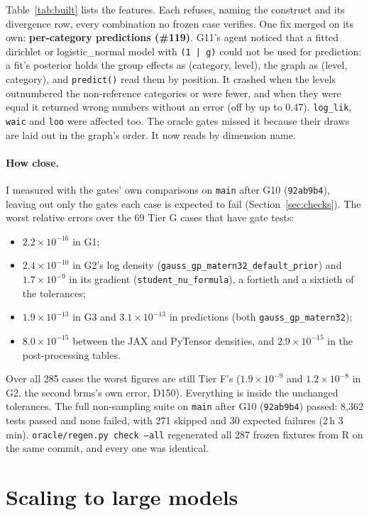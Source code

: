 \documentclass[11pt]{article}
\newcommand{\code}[1]{\texttt{#1}}
\begin{document}
\noindent Table~\ref{tab:built} lists the features. Each refuses, naming the construct and its divergence row, every
combination no frozen case verifies. One fix merged on its own: \textbf{per-category predictions (\#119)}. G11's agent noticed
that a fitted dirichlet or logistic\_normal model with \code{(1 | g)} could not be used for prediction: a fit's posterior
holds the group effects as (category, level), the graph as (level, category), and \code{predict()} read them by position. It
crashed when the levels outnumbered the non-reference categories or were fewer, and when they were equal it returned wrong
numbers without an error (off by up to 0.47). \code{log\_lik}, \code{waic} and \code{loo} were affected too. The oracle
gates missed it because their draws are laid out in the graph's order. It now reads by dimension name.

\paragraph{How close.} I measured with the gates' own comparisons on \code{main} after G10 (\code{92ab9b4}), leaving out only the
gates each case is expected to fail (Section~\ref{sec:checks}). The worst relative errors over the 69 Tier G cases that have
gate tests:
\begin{itemize}
\item $2.2\times10^{-16}$ in G1;
\item $2.4\times10^{-10}$ in G2's log density (\code{gauss\_gp\_matern32\_default\_prior}) and $1.7\times10^{-9}$ in its
  gradient (\code{student\_nu\_formula}), a fortieth and a sixtieth of the tolerances;
\item $1.9\times10^{-13}$ in G3 and $3.1\times10^{-13}$ in predictions (both \code{gauss\_gp\_matern32});
\item $8.0\times10^{-15}$ between the JAX and PyTensor densities, and $2.9\times10^{-15}$ in the post-processing tables.
\end{itemize}
Over all 285 cases the worst figures are still Tier F's ($1.9\times10^{-9}$ and $1.2\times10^{-8}$ in G2, the second brms's
own error, D150). Everything is inside the unchanged tolerances.
The full non-sampling suite on \code{main} after G10 (\code{92ab9b4}) passed: 8{,}362 tests passed and none failed, with 271 skipped and 30 expected failures (2\,h 3\,min).
\code{oracle/regen.py check --all} regenerated all 287 frozen fixtures from R on the same commit, and every one was identical.

\section{Scaling to large models}
\label{sec:scale}
\end{document}
